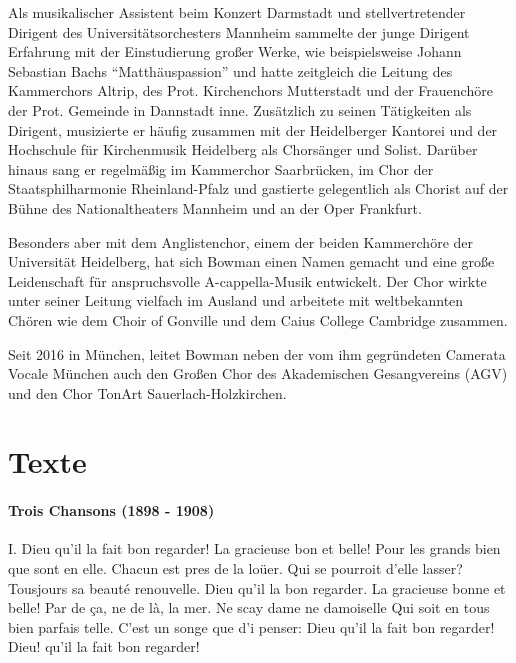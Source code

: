 \documentclass[11pt, ngermanm, titlepage]{article}
\begin{document}
\begin{multicols}{2}
	Als musikalischer Assistent beim Konzert Darmstadt und stellvertretender Dirigent des Universitätsorchesters Mannheim sammelte der junge Dirigent Erfahrung mit der Einstudierung großer Werke, wie beispielsweise Johann Sebastian Bachs "`Matthäuspassion"' und hatte zeitgleich die Leitung des Kammerchors Altrip, des Prot. Kirchenchors Mutterstadt und der Frauenchöre der Prot. Gemeinde in Dannstadt inne. Zusätzlich zu seinen Tätigkeiten als Dirigent, musizierte er häufig zusammen mit der Heidelberger Kantorei und der Hochschule für Kirchenmusik Heidelberg als Chorsänger und Solist. Darüber hinaus sang er regelmäßig im Kammerchor Saarbrücken, im Chor der Staatsphilharmonie Rheinland-Pfalz und gastierte gelegentlich als Chorist auf der Bühne des Nationaltheaters Mannheim und an der Oper Frankfurt.
	 
	Besonders aber mit dem Anglistenchor, einem der beiden Kammerchöre der Universität Heidelberg, hat sich Bowman einen Namen gemacht und eine große Leidenschaft für anspruchsvolle A-cappella-Musik entwickelt. Der Chor wirkte unter seiner Leitung vielfach im Ausland und arbeitete mit weltbekannten Chören wie dem Choir of Gonville und dem Caius College Cambridge zusammen.
	 
	Seit 2016 in München, leitet Bowman neben der vom ihm gegründeten Camerata Vocale München auch den Großen Chor des Akademischen Gesangvereins (AGV) und den Chor TonArt Sauerlach-Holzkirchen.
	\vfill
	\pagebreak
	
	\section*{Texte}
	
	\paragraph{Trois Chansons (1898 - 1908)\newline}
	I. Dieu qu'il la fait bon regarder!\newline
	La gracieuse bon et belle!\newline
	Pour les grands bien que sont en elle.\newline
	Chacun est pres de la loüer.\newline
	Qui se pourroit d'elle lasser?\newline
	Tousjours sa beauté renouvelle.\newline
	Dieu qu'il la bon regarder.\newline
	La gracieuse bonne et belle!\newline
	Par de ça, ne de là, la mer.\newline
	Ne scay dame ne damoiselle\newline
	Qui soit en tous bien parfais telle.\newline
	C'est un songe que d'i penser:\newline
	Dieu qu'il la fait bon regarder!\newline
	Dieu! qu'il la fait bon regarder!\newline
		

\end{multicols}
\end{document}
